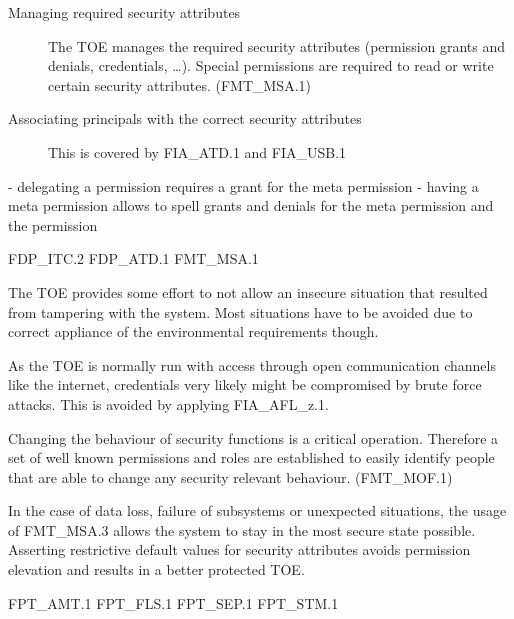 \documentclass[12pt,english]{scrbook}
\begin{document}
\begin{description}
        \item[Managing required security attributes]

            The TOE manages the required security attributes (permission grants
            and denials, credentials, \dots). Special permissions are required
            to read or write certain security attributes. (FMT\_MSA.1)

        \item[Associating principals with the correct security attributes]

            This is covered by FIA\_ATD.1 and FIA\_USB.1

    \end{description}


    - delegating a permission requires a grant for the meta permission
    - having a meta permission allows to spell grants and denials for the meta permission and the permission
    
    FDP\_ITC.2
    FDP\_ATD.1
    FMT\_MSA.1



    The TOE provides some effort to not allow an insecure situation that
    resulted from tampering with the system. Most situations have to be avoided
    due to correct appliance of the environmental requirements though.

    As the TOE is normally run with access through open communication channels
    like the internet, credentials very likely might be compromised by brute
    force attacks. This is avoided by applying FIA\_AFL\_z.1.

    Changing the behaviour of security functions is a critical operation.
    Therefore a set of well known permissions and roles are established to
    easily identify people that are able to change any security relevant
    behaviour. (FMT\_MOF.1)
    
    In the case of data loss, failure of subsystems or unexpected situations,
    the usage of FMT\_MSA.3 allows the system to stay in the most secure state
    possible. Asserting restrictive default values for security attributes
    avoids permission elevation and results in a better protected TOE.
    
    FPT\_AMT.1
    FPT\_FLS.1
    FPT\_SEP.1
    FPT\_STM.1

\end{document}
